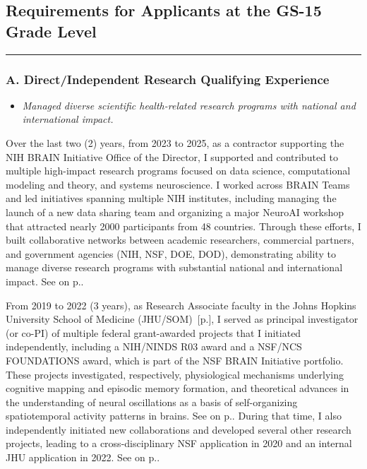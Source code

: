 \documentclass[10pt]{article}
\newcommand{\see}[1]{[\textcolor{hopkinsblue}{p.\pageref{sec:#1}}]}
\newcommand{\cf}[1]{\textcolor{hopkinsblue}{See \emph{\nameref{sec:#1}} on p.\pageref{sec:#1}}}
\begin{document}
\subsection*{Requirements for Applicants at the GS-15 Grade Level}
\vspace{-.1in}
\hrule
\vspace{.1in}
\subsubsection*{A. Direct/Independent Research Qualifying Experience}

\begin{itemize}
  \color{hopkinsblue}
  \item \emph{Managed diverse scientific health-related research programs with
national and international impact.}
\end{itemize}

Over the last two (2) years, from 2023 to 2025, as a contractor supporting the
NIH BRAIN Initiative Office of the Director, I supported and contributed to
multiple high-impact research programs focused on data science, computational
modeling and theory, and systems neuroscience. I worked across BRAIN Teams
and led initiatives spanning multiple NIH institutes, including managing the
launch of a new data sharing team and organizing a major NeuroAI workshop that
attracted nearly 2000 participants from 48 countries. Through these efforts, I
built collaborative networks between academic researchers, commercial partners,
and government agencies (NIH, NSF, DOE, DOD), demonstrating ability to manage
diverse research programs with substantial national and international impact.
\cf{jobobd}.

From 2019 to 2022 (3 years), as Research Associate faculty in the Johns
Hopkins University School of Medicine (JHU/SOM)~\see{job1}, I served as
principal investigator (or co-PI) of multiple federal grant-awarded projects
that I initiated independently, including a NIH/NINDS R03 award and a NSF/NCS
FOUNDATIONS award, which is part of the NSF BRAIN Initiative portfolio. These
projects investigated, respectively, physiological mechanisms underlying
cognitive mapping and episodic memory formation, and theoretical advances
in the understanding of neural oscillations as a basis of self-organizing
spatiotemporal activity patterns in brains. \cf{funding}. During that time, I
also independently initiated new collaborations and developed several other
research projects, leading to a cross-disciplinary NSF application in 2020 and
an internal JHU application in 2022. \cf{resprogram}.
\end{document}
